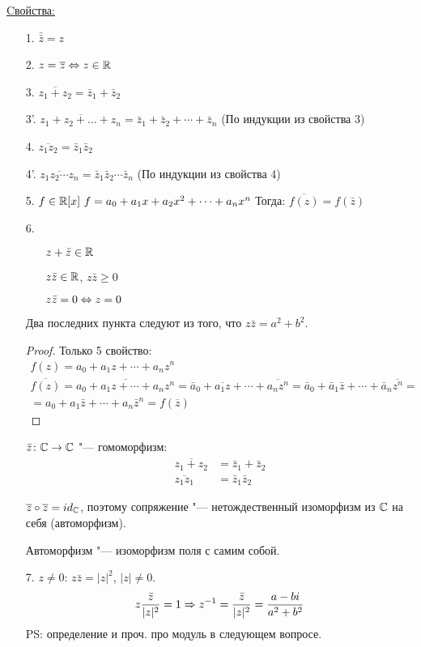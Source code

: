 \underline{Cвойства:}
\begin{itemize}
\item[1.] $\bar{\bar z} = z$
\item[2.] $z = \overline{z} \Leftrightarrow z \in \mathbb{R}$
\item[3.] $\overline{z_1 + z_2} = \bar z_1 + \bar z_2$
\item[3'.] $\overline{z_1 + z_2 + \dots + z_n} = \bar z_1 + \bar z_2 + \cdots + \bar z_n$ (По индукции из свойства 3)
\item[4.] $\overline{z_1z_2} = \bar z_1 \bar z_2$
\item[4'.] $\overline{z_1 z_2 \cdots z_n} = \bar z_1 \bar z_2 \cdots \bar z_n$ (По индукции из свойства 4)
\item[5.] $f \in \mathbb{R}[x]~f = a_0 + a_1x + a_2x^2 + \dots + a_nx^n$ Тогда: $\overline{f(z)} = f(\bar z)$
\item[6.] \begin{itemize}
			\item[\bullet] $z + \bar z \in \mathbb{R}$ 
			\item[\bullet] $z \bar z \in \mathbb{R}$, $z \bar z \ge 0$
			\item[\bullet] $z \bar z = 0 \Leftrightarrow z = 0$
		 \end{itemize}	
Два последних пункта следуют из того, что $z \bar z = a^2 + b^2$.
\begin{proof}
Только 5 свойство:
\begin{gather*}
f(z)=a_0 + a_1z + \cdots + a_nz^n \\
\overline{f(z)} = \overline{a_0 + a_1z + \cdots + a_nz^n} = \bar a_0 + \overline{a_1z} + \cdots + \overline{a_nz^n} = \bar a_0 + \bar a_1 \bar z + \cdots + \bar a_n \overline{z^n} = \\
= a_0 + a_1\bar {z} + \cdots + a_n\bar z^n = f(\overline{z})
\end{gather*}
\end{proof}   

$\bar z\colon \mathbb{C} \rightarrow \mathbb{C}$ "--- гомоморфизм:
\begin{align*}
\overline{z_1 + z_2} &= \bar z_1 + \bar z_2 \\
\overline{z_1 z_1} &= \bar z_1 \bar z_2
\end{align*}

$\overline{z} \circ \overline{z} = id_{\mathbb{C}}$, поэтому сопряжение "--- нетождественный изоморфизм из $\mathbb{C}$ на себя (автоморфизм).
\begin{Def}
Автоморфизм "--- изоморфизм поля с самим собой.
\end{Def}
\item[7.] $z \ne 0$: $z \bar z = |z|^2$, $|z| \ne 0$.
\begin{gather*}
z \frac{\bar z}{|z|^2} = 1 \Rightarrow z^{-1} = \frac{\bar z}{|z|^2} = \frac{a - bi}{a^2 + b^2}
\end{gather*}
PS: определение и проч. про модуль в следующем вопросе.
\end{itemize}

